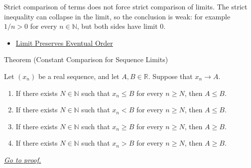 \begin{remark*}[Interpretation]
Strict comparison of terms does not force strict comparison of limits. The
strict inequality can collapse in the limit, so the conclusion is weak:
for example $1/n>0$ for every $n\in\mathbb{N}$, but both sides have limit
$0$.
\end{remark*}

\begin{dependencies}
\begin{itemize}
  \item \hyperref[thm:limit-preserves-eventual-order]{Limit Preserves Eventual Order}
\end{itemize}
\end{dependencies}


\begin{theorembox}{Theorem (Constant Comparison for Sequence Limits)}
\begin{theorem}
\label{thm:constant-comparison-sequence-limits}

Let $(x_n)$ be a real sequence, and let $A,B\in\mathbb{R}$. Suppose
that $x_n\to A$.
\begin{enumerate}[label=(\alph*)]
  \item If there exists $N\in\mathbb{N}$ such that $x_n\le B$ for every
  $n\ge N$, then $A\le B$.
  \item If there exists $N\in\mathbb{N}$ such that $x_n<B$ for every
  $n\ge N$, then $A\le B$.
  \item If there exists $N\in\mathbb{N}$ such that $x_n\ge B$ for every
  $n\ge N$, then $A\ge B$.
  \item If there exists $N\in\mathbb{N}$ such that $x_n>B$ for every
  $n\ge N$, then $A\ge B$.
\end{enumerate}

\smallskip
\noindent
\hyperref[prf:constant-comparison-sequence-limits]{\textit{Go to proof.}}
\end{theorem}
\end{theorembox}

